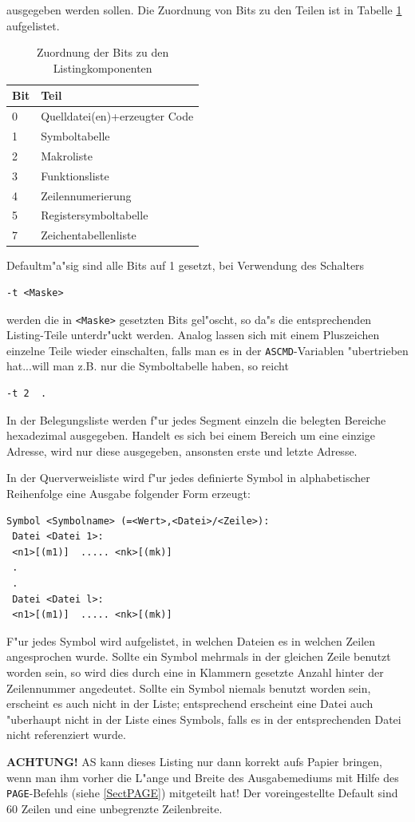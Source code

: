 \documentclass[12pt,a4paper,twoside]{report}
\newcommand{\bb}[1]{{\bf #1}}
\newcommand{\tty}[1]{{\tt #1}}
\newcommand{\asname}{AS}
\begin{document}
ausgegeben werden sollen.  Die Zuordnung von Bits zu den Teilen ist in
Tabelle \ref{TabTBits} aufgelistet.
\par
\begin{table}[p]
\begin{center}\begin{tabular}{|l|l|}
\hline
Bit & Teil \\
\hline
\hline
0   & Quelldatei(en)+erzeugter Code \\
1   & Symboltabelle \\
2   & Makroliste \\
3   & Funktionsliste \\
4   & Zeilennumerierung \\
5   & Registersymboltabelle \\
7   & Zeichentabellenliste \\
\hline
\end{tabular}\end{center}
\caption{Zuordnung der Bits zu den Listingkomponenten\label{TabTBits}}
\end{table}
Defaultm"a"sig sind alle Bits auf 1 gesetzt, bei Verwendung des Schalters
\begin{verbatim}
-t <Maske>
\end{verbatim}
werden die in \verb!<Maske>! gesetzten Bits gel"oscht, so da"s die entsprechenden
Listing-Teile unterdr"uckt werden.  Analog lassen sich mit einem Pluszeichen
einzelne Teile wieder einschalten, falls man es in der \tty{ASCMD}-Variablen
"ubertrieben hat...will man z.B. nur die Symboltabelle haben, so reicht
\begin{verbatim}
-t 2  .
\end{verbatim}
In der Belegungsliste werden f"ur jedes Segment einzeln die belegten Bereiche
hexadezimal ausgegeben.  Handelt es sich bei einem Bereich um eine einzige
Adresse, wird nur diese ausgegeben, ansonsten erste und letzte Adresse.
\par
In der Querverweisliste wird f"ur jedes definierte Symbol in alphabetischer
Reihenfolge eine Ausgabe folgender Form erzeugt:
\begin{verbatim}
Symbol <Symbolname> (=<Wert>,<Datei>/<Zeile>):
 Datei <Datei 1>:
 <n1>[(m1)]  ..... <nk>[(mk)]
 .
 .
 Datei <Datei l>:
 <n1>[(m1)]  ..... <nk>[(mk)]
\end{verbatim}
F"ur jedes Symbol wird aufgelistet, in welchen Dateien es in welchen Zeilen
angesprochen wurde.  Sollte ein Symbol mehrmals in der gleichen Zeile
benutzt worden sein, so wird dies durch eine in Klammern gesetzte Anzahl
hinter der Zeilennummer angedeutet.  Sollte ein Symbol niemals benutzt
worden sein, erscheint es auch nicht in der Liste; entsprechend erscheint
eine Datei auch "uberhaupt nicht in der Liste eines Symbols, falls es in
der entsprechenden Datei nicht referenziert wurde.
\par
\bb{ACHTUNG!} \asname{} kann dieses Listing nur dann korrekt aufs Papier bringen,
wenn man ihm vorher die L"ange und Breite des Ausgabemediums mit Hilfe des
\tty{PAGE}-Befehls (siehe \ref{SectPAGE}) mitgeteilt hat!  Der voreingestellte
Default sind 60 Zeilen und eine unbegrenzte Zeilenbreite.
\end{document}
